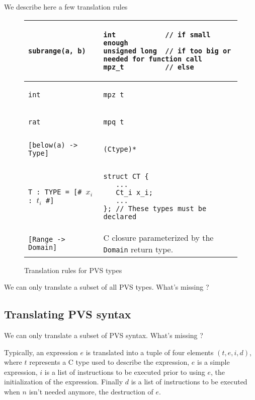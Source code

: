 \documentclass[12pt,a4paper]{article}
\newcommand{\cl}[1]{\texttt{#1}}
\begin{document}
We describe here a few translation rules
\begin{figure}[!ht]
\begin{tabular}{|l|l|}
\hline
\cl{subrange(a, b)} &
\begin{lstlisting}
int            // if small enough
unsigned long  // if too big or needed for function call
mpz_t          // else
\end{lstlisting} \\ \hline
\cl{int} &
\begin{lstlisting}
mpz_t
\end{lstlisting} \\ \hline
\cl{rat} &
\begin{lstlisting}
mpq_t
\end{lstlisting} \\ \hline
\cl{[below(a) -> Type]} &
\begin{lstlisting}
(Ctype)*
\end{lstlisting} \\ \hline
\cl{T : TYPE = [\# $x_i$ : $t_i$ \#]}  &
\begin{lstlisting}
struct CT {
   ...
   Ct_i x_i;
   ...
}; // These types must be declared
\end{lstlisting} \\ \hline
\cl{[Range -> Domain]} & C closure parameterized by the \cl{Domain} return type.\\ \hline
\end{tabular}
\caption{Translation rules for PVS types}
\end{figure}



We can only translate a subset of all PVS types.
What's missing ?












\subsection{Translating PVS syntax}
\label{subsec:pvssyntax}


We can only translate a subset of PVS syntax.
What's missing ?


Typically, an expression $e$ is translated into a tuple of four elements $(t,e,i,d)$, where $t$ represents a C type used to describe the expression, $e$ is a simple expression, $i$ is a list of instructions to be executed prior to using $e$, the initialization of the expression. Finally $d$ is a list of instructions to be executed when $n$ isn't needed anymore, the destruction of $e$.
\end{document}
